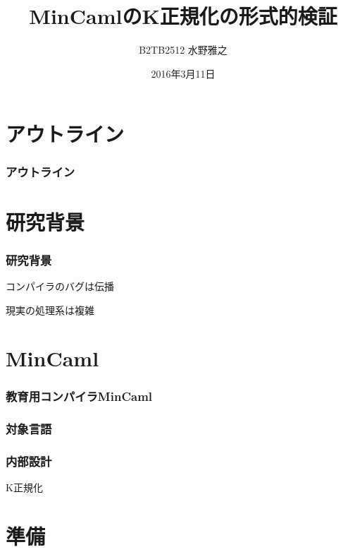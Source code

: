 \documentclass[dvipdfmx,cjk,xcolor=dvipsnames,envcountsect,notheorems,12pt]{beamer}
\title{MinCamlのK正規化の形式的検証}
\author{B2TB2512 水野雅之}
\institute[東北大学　住井・松田研]{工学部　電気情報物理工学科\\住井・松田研究室}%
\date{2016年3月11日}
\theoremstyle{definition}
\begin{document}
\frame[plain]{\titlepage}%

\section*{アウトライン}

\begin{frame}
  \frametitle{アウトライン}
  \tableofcontents[sectionstyle=show,subsectionstyle=hide]
\end{frame}

\section{研究背景}

\begin{frame}
	\frametitle{研究背景}
	\Huge コンパイラのバグは伝播
\end{frame}

\begin{frame}
	\Huge 現実の処理系は複雑
\end{frame}

\section{MinCaml}

\begin{frame}
	\frametitle{教育用コンパイラMinCaml}
	\Huge 
\end{frame}

\begin{frame}
	\frametitle{対象言語}
\end{frame}

\begin{frame}
	\frametitle{内部設計}
\end{frame}

\begin{frame}
	\Huge K正規化
\end{frame}

\section{準備}
\end{document}
